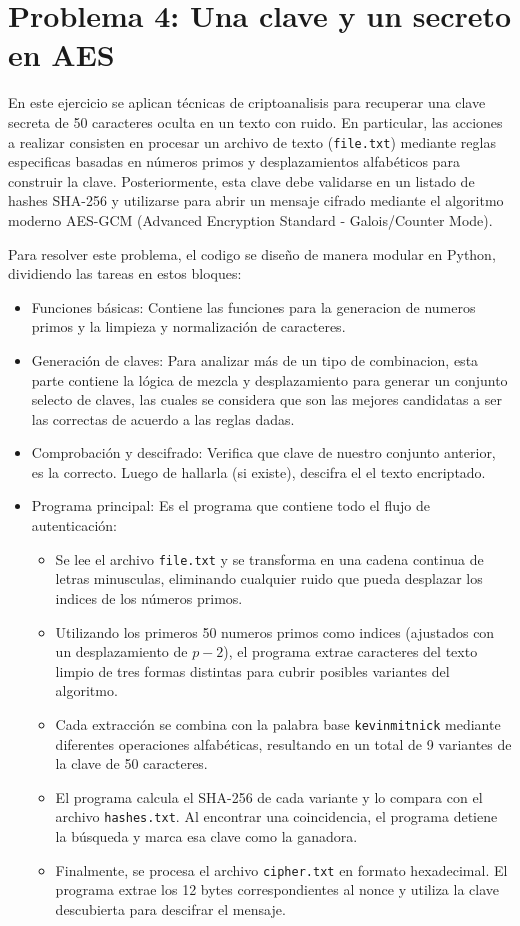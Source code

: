 \section*{Problema 4: Una clave y un secreto en AES }

En este ejercicio se aplican técnicas de criptoanalisis para recuperar una clave secreta de 50 caracteres oculta en un texto con ruido. En particular, las acciones a realizar consisten en procesar un archivo de texto (\texttt{file.txt}) mediante reglas especificas basadas en números primos y desplazamientos alfabéticos para construir la clave. Posteriormente, esta clave debe validarse en un listado de hashes SHA-256 y utilizarse para abrir un mensaje cifrado mediante el algoritmo moderno AES-GCM (Advanced Encryption Standard - Galois/Counter Mode).

Para resolver este problema, el codigo se diseño de manera modular en Python, dividiendo las tareas en estos bloques:
\begin{itemize}
	\item Funciones básicas: Contiene las funciones para la generacion de numeros primos y la limpieza y normalización de caracteres.
	\item Generación de claves:  Para analizar más de un tipo de combinacion, esta parte contiene la lógica de mezcla y desplazamiento para generar un conjunto selecto de claves, las cuales se considera que son las mejores candidatas a ser las correctas de acuerdo a las reglas dadas.
	\item Comprobación  y descifrado:  Verifica que clave de nuestro conjunto anterior, es la correcto. Luego de hallarla (si existe), descifra el el texto encriptado.
	\item Programa principal: Es el programa que contiene todo el flujo de autenticación:
	\begin{itemize}
		\item Se lee el archivo \texttt{file.txt} y se transforma en una cadena continua de letras minusculas, eliminando cualquier ruido que pueda desplazar los indices de los números primos.
		\item Utilizando los primeros 50 numeros primos como indices (ajustados con un desplazamiento de $p-2$), el programa extrae caracteres del texto limpio de tres formas distintas para cubrir posibles variantes del algoritmo.
		\item Cada extracción se combina con la palabra base \texttt{kevinmitnick} mediante diferentes operaciones alfabéticas, resultando en un total de 9 variantes de la clave de 50 caracteres.
		\item El programa calcula el SHA-256 de cada variante y lo compara con el archivo \texttt{hashes.txt}. Al encontrar una coincidencia, el programa detiene la búsqueda y marca esa clave como la ganadora.
		\item Finalmente, se procesa el archivo \texttt{cipher.txt} en formato hexadecimal. El programa extrae los 12 bytes correspondientes al nonce y utiliza la clave descubierta para descifrar el mensaje.
	\end{itemize}
\end{itemize}
